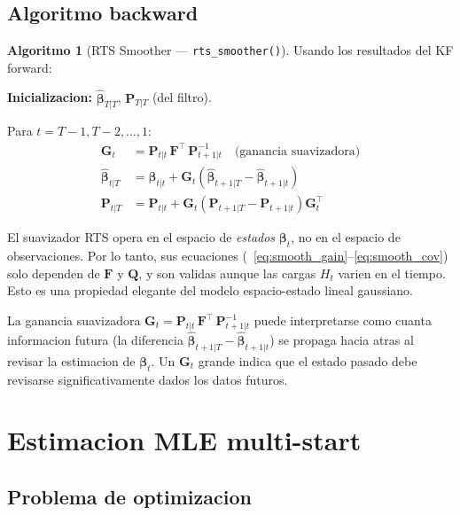 \documentclass[12pt, a4paper]{article}
\theoremstyle{plain}
\theoremstyle{definition}
\newtheorem{algoritmo}{Algoritmo}[section]
\theoremstyle{remark}
\newcommand{\bbet}{\bm{\beta}}
\newcommand{\bF}{\mathbf{F}}
\newcommand{\bQ}{\mathbf{Q}}
\newcommand{\bP}{\mathbf{P}}
\newcommand{\bG}{\mathbf{G}}
\begin{document}
\subsection{Algoritmo backward}

\begin{algoritmo}[RTS Smoother --- \texttt{rts\_smoother()}]
\label{alg:rts}
Usando los resultados del KF forward:

\textbf{Inicializacion:}
$\hat{\bbet}_{T|T}$, $\bP_{T|T}$ (del filtro).

Para $t = T-1, T-2, \ldots, 1$:
\begin{align}
  \bG_t &= \bP_{t|t}\,\bF^\top\,\bP_{t+1|t}^{-1}
  \quad \text{(ganancia suavizadora)}
  \label{eq:smooth_gain} \\
  \hat{\bbet}_{t|T} &= \hat{\bbet}_{t|t}
    + \bG_t\!\left(\hat{\bbet}_{t+1|T} - \hat{\bbet}_{t+1|t}\right)
  \label{eq:smooth_state} \\
  \bP_{t|T} &= \bP_{t|t}
    + \bG_t\!\left(\bP_{t+1|T} - \bP_{t+1|t}\right)\bG_t^\top
  \label{eq:smooth_cov}
\end{align}
\end{algoritmo}

\begin{notabox}
El suavizador RTS opera en el espacio de \emph{estados} $\bbet_t$,
no en el espacio de observaciones. Por lo tanto, sus ecuaciones
(~\ref{eq:smooth_gain}--\ref{eq:smooth_cov}) solo dependen de $\bF$ y $\bQ$,
y son validas aunque las cargas $H_t$ varien en el tiempo.
Esto es una propiedad elegante del modelo espacio-estado lineal gaussiano.
\end{notabox}

La ganancia suavizadora $\bG_t = \bP_{t|t}\,\bF^\top\,\bP_{t+1|t}^{-1}$
puede interpretarse como cuanta informacion futura (la diferencia
$\hat{\bbet}_{t+1|T} - \hat{\bbet}_{t+1|t}$) se propaga hacia atras al
revisar la estimacion de $\bbet_t$. Un $\bG_t$ grande indica que el estado
pasado debe revisarse significativamente dados los datos futuros.

\section{Estimacion MLE multi-start}
\label{sec:mle}

\subsection{Problema de optimizacion}
\end{document}
